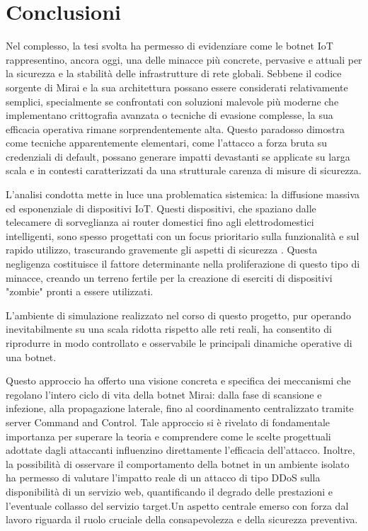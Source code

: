 \chapter{Conclusioni}

Nel complesso, la tesi svolta ha permesso di evidenziare come le botnet IoT rappresentino, ancora oggi, una delle minacce più concrete, pervasive e attuali per la sicurezza e la stabilità delle infrastrutture di rete globali. Sebbene il codice sorgente di Mirai e la sua architettura possano essere considerati relativamente semplici, specialmente se confrontati con soluzioni malevole più moderne che implementano crittografia avanzata o tecniche di evasione complesse, la sua efficacia operativa rimane sorprendentemente alta. Questo paradosso dimostra come tecniche apparentemente elementari, come l'attacco a forza bruta su credenziali di default, possano generare impatti devastanti se applicate su larga scala e in contesti caratterizzati da una strutturale carenza di misure di sicurezza.

L’analisi condotta mette in luce una problematica sistemica: la diffusione massiva ed esponenziale di dispositivi IoT. Questi dispositivi, che spaziano dalle telecamere di sorveglianza ai router domestici fino agli elettrodomestici intelligenti, sono spesso progettati con un focus prioritario sulla funzionalità e sul rapido utilizzo, trascurando gravemente gli aspetti di sicurezza . Questa negligenza costituisce il fattore determinante nella proliferazione di questo tipo di minacce, creando un terreno fertile per la creazione di eserciti di dispositivi "zombie" pronti a essere utilizzati. 

L’ambiente di simulazione realizzato nel corso di questo progetto, pur operando inevitabilmente su una scala ridotta rispetto alle reti reali, ha consentito di riprodurre in modo controllato e osservabile le principali dinamiche operative di una botnet. 

Questo approccio ha offerto una visione concreta e specifica dei meccanismi che regolano l'intero ciclo di vita della botnet Mirai: dalla fase di scansione e infezione, alla propagazione laterale, fino al coordinamento centralizzato tramite server Command and Control. Tale approccio si è rivelato di fondamentale importanza per superare la teoria e comprendere come le scelte progettuali adottate dagli attaccanti influenzino direttamente l'efficacia dell'attacco. Inoltre, la possibilità di osservare il comportamento della botnet in un ambiente isolato ha permesso di valutare l’impatto reale di un attacco di tipo DDoS sulla disponibilità di un servizio web, quantificando il degrado delle prestazioni e l'eventuale collasso del servizio target.Un aspetto centrale emerso con forza dal lavoro riguarda il ruolo cruciale della consapevolezza e della sicurezza preventiva. 

